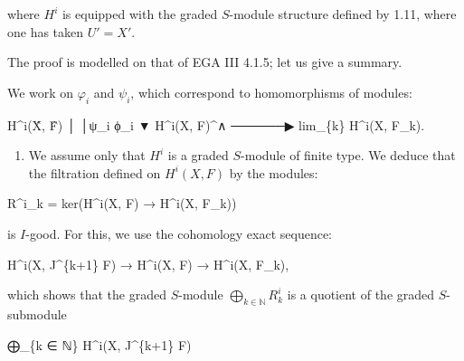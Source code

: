 \documentclass[
]{article}
\newenvironment{Shaded}{}{}
\newcommand{\NormalTok}[1]{#1}
\providecommand{\tightlist}{%
  \setlength{\itemsep}{0pt}\setlength{\parskip}{0pt}}
\begin{document}
where \(H^{i}\) is equipped with the graded \(S\)-module structure
defined by 1.11, where one has taken \(U' = X'\).

The proof is modelled on that of EGA III 4.1.5; let us give a summary.

We work on \(\varphi_{i}\) and \(\psi_{i}\), which correspond to
homomorphisms of modules:

\begin{Shaded}
\begin{Highlighting}[]
\NormalTok{                              H\^{}i(X̂, F̂)}
\NormalTok{                                  │}
\NormalTok{                                  │ψ\_i}
\NormalTok{                  ϕ\_i             ▼}
\NormalTok{   H\^{}i(X, F)\^{}∧  ──────▶  lim\_\{k\} H\^{}i(X, F\_k).}
\end{Highlighting}
\end{Shaded}

\begin{enumerate}
\def\labelenumi{(\alph{enumi})}
\tightlist
\item
  We assume only that \(H^{i}\) is a graded \(S\)-module of finite type.
  We deduce that the filtration defined on \(H^{i}(X, F)\) by the
  modules:
\end{enumerate}

\begin{Shaded}
\begin{Highlighting}[]
\NormalTok{R\^{}i\_k = ker(H\^{}i(X, F) → H\^{}i(X, F\_k))}
\end{Highlighting}
\end{Shaded}

is \(I\)-good. For this, we use the cohomology exact sequence:

\begin{Shaded}
\begin{Highlighting}[]
\NormalTok{H\^{}i(X, J\^{}\{k+1\} F) → H\^{}i(X, F) → H\^{}i(X, F\_k),}
\end{Highlighting}
\end{Shaded}

which shows that the graded \(S\)-module
\(\bigoplus_{k \in \mathbb{N}} R^{i}_{k}\) is a quotient of the graded
\(S\)-submodule

\begin{Shaded}
\begin{Highlighting}[]
\NormalTok{⨁\_\{k ∈ ℕ\} H\^{}i(X, J\^{}\{k+1\} F)}
\end{Highlighting}
\end{Shaded}
\end{document}
